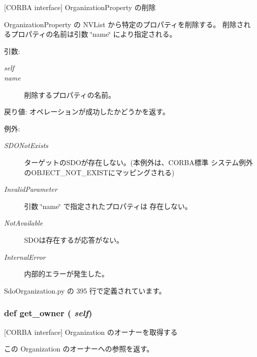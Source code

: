 [CORBA interface] OrganizationProperty の削除 

OrganizationProperty の NVList から特定のプロパティを削除する。 削除されるプロパティの名前は引数 \char`\"{}name\char`\"{} により指定される。

\begin{Desc}
\item[引数:]
\begin{description}
\item[{\em self}]\item[{\em name}]削除するプロパティの名前。\end{description}
\end{Desc}
\begin{Desc}
\item[戻り値:]オペレーションが成功したかどうかを返す。\end{Desc}
\begin{Desc}
\item[例外:]
\begin{description}
\item[{\em SDONotExists}]ターゲットのSDOが存在しない。(本例外は、CORBA標準 システム例外のOBJECT\_\-NOT\_\-EXISTにマッピングされる) \item[{\em InvalidParameter}]引数 \char`\"{}name\char`\"{} で指定されたプロパティは 存在しない。 \item[{\em NotAvailable}]SDOは存在するが応答がない。 \item[{\em InternalError}]内部的エラーが発生した。 \end{description}
\end{Desc}


 SdoOrganization.py の 395 行で定義されています。
\subsubsection{\setlength{\rightskip}{0pt plus 5cm}def get\_\-owner ( {\em self})}\label{classsource__py_1_1_sdo_organization_1_1_organization__impl_7bcb4acb7f1606fbbe7ff315ca8e1d31}


[CORBA interface] Organization のオーナーを取得する 

この Organization のオーナーへの参照を返す。

